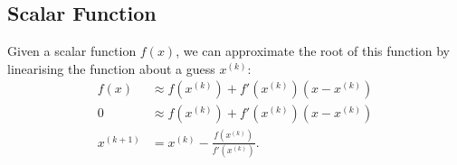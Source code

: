 \documentclass{article}
\begin{document}
\subsection{Scalar Function}
Given a scalar function \(f\left( x \right)\), we can approximate the
root of this function by linearising the function about a guess
\(x^{\left( k \right)}\):
\begin{align*}
    f\left( x \right)      & \approx f\left( x^{\left( k \right)} \right) + f'\left( x^{\left( k \right)} \right) \left( x - x^{\left( k \right)} \right) \\
    0                      & \approx f\left( x^{\left( k \right)} \right) + f'\left( x^{\left( k \right)} \right) \left( x - x^{\left( k \right)} \right) \\
    x^{\left( k+1 \right)} & = x^{\left( k \right)} - \frac{f\left( x^{\left( k \right)} \right)}{f'\left( x^{\left( k \right)} \right)}.
\end{align*}
\end{document}
